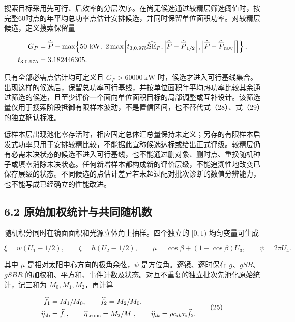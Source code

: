 \documentclass[UTF8,fontset=windows,zihao=-4]{ctexart}
\begin{document}
\par\noindent\begin{minipage}{\linewidth}
搜索目标采用先可行、后效率的分层次序。在尚无候选通过较精层筛选阈值时，按完整60时点的年平均总功率点估计安排候选，并同时保留单位面积功率。对较精层候选，定义搜索保留量

\[
\begin{aligned}
G_P&=\widehat{\overline P}-
\max\!\left\{50\ \mathrm{kW},\ 2\max\!\left[
t_{3,0.975}\widehat{\mathrm{SE}}_{P},
\left|\widehat{\overline P}-\widehat{\overline P}_{1/2}\right|,
\left|\widehat{\overline P}-\widehat{\overline P}_{\rm raw}\right|
\right]\right\},\\
t_{3,0.975}&=3.182446305.
\end{aligned}
\]
\end{minipage}\par

只有全部必需点估计均可定义且 \(G_P>60000\ \mathrm{kW}\) 时，候选才进入可行基线集合。出现这样的候选后，保留总功率可行基线，并按单位面积年平均热功率比较其余通过筛选的候选，且至少评价一个面向单位面积目标的局部调整或互补设计。该筛选量仅用于搜索阶段抵御有限样本波动，不是置信区间，也不替代式（28）、式（29）的独立确认标准。

低样本层出现池化零存活时，相应固定总体汇总量保持未定义；另存的有限样本启发式功率只用于安排较精比较，不能据此宣称候选达标或给出正式评级。较精层仍有必需未决状态的候选不进入可行基线，也不能通过删对象、删时点、重换随机种子或填零消除未决状态。任何新增样本都构成新的评价层级，不能追溯性地改变已保存层级的状态。不同候选的点估计差异若未超过配对批次诊断的数值分辨能力，也不能写成已经确立的性能改进。

\subsection*{6.2 原始加权统计与共同随机数}

\par\noindent\begin{minipage}{\linewidth}
随机积分同时在镜面面积和光源立体角上抽样。四个独立的 \([0,1)\) 均匀变量可生成

\[
\xi=w(U_1-1/2),\qquad\zeta=h(U_2-1/2),\qquad
\mu=\cos\beta+(1-\cos\beta)U_3,\qquad
\psi=2\pi U_4.
\tag{24}
\]
\end{minipage}\par

\par\noindent\begin{minipage}{\linewidth}
其中 \(\mu\) 是相对太阳中心方向的极角余弦，\(\psi\) 是方位角。逐镜、逐时保存 \(g\)、\(gSB\)、\(gSBR\) 的加权和、平方和、事件计数及状态。对互不重复的独立批次先池化原始统计，记三和为 \(M_0,M_1,M_2\)，再计算

\[
\begin{aligned}
\widehat f_1&=M_1/M_0,\qquad\widehat f_2=M_2/M_0,\\
\widehat\eta_{\rm sb}&=\widehat f_1,\qquad
\widehat\eta_{\rm trunc}=M_2/M_1,\qquad
\widehat\eta_{ik}=\rho c_{ik}\tau_i\widehat f_2.
\end{aligned}
\tag{25}
\]
\end{minipage}\par
\end{document}
